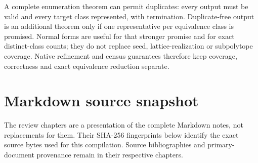 \documentclass[11pt,a4paper,oneside]{report}
\begin{document}
A complete enumeration theorem can permit duplicates: every output must
be valid and every target class represented, with termination.
Duplicate-free output is an additional theorem only if one
representative per equivalence class is promised. Normal forms are
useful for that stronger promise and for exact distinct-class counts;
they do not replace seed, lattice-realization or subpolytope coverage.
Native refinement and census guarantees therefore keep coverage,
correctness and exact equivalence reduction separate.

\appendix
\chapter{Markdown source snapshot}
\label{markdown-source-snapshot}
The review chapters are a presentation of the complete Markdown notes,
not replacements for them. Their SHA-256 fingerprints below identify
the exact source bytes used for this compilation. Source bibliographies
and primary-document provenance remain in their respective chapters.
\end{document}
